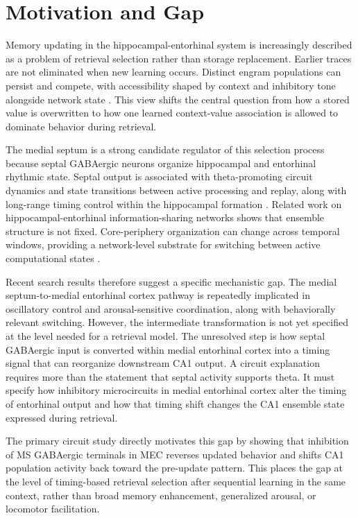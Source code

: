 \section{Motivation and Gap}

Memory updating in the hippocampal-entorhinal system is increasingly described as a problem of retrieval selection rather than storage replacement. Earlier traces are not eliminated when new learning occurs. Distinct engram populations can persist and compete, with accessibility shaped by context and inhibitory tone alongside network state \cite{arxiv250601659,arxiv220604924,arxiv171109876}. This view shifts the central question from how a stored value is overwritten to how one learned context-value association is allowed to dominate behavior during retrieval.

The medial septum is a strong candidate regulator of this selection process because septal GABAergic neurons organize hippocampal and entorhinal rhythmic state. Septal output is associated with theta-promoting circuit dynamics and state transitions between active processing and replay, along with long-range timing control within the hippocampal formation \cite{arxiv151001100}. Related work on hippocampal-entorhinal information-sharing networks shows that ensemble structure is not fixed. Core-periphery organization can change across temporal windows, providing a network-level substrate for switching between active computational states \cite{arxiv200106371}.

Recent search results therefore suggest a specific mechanistic gap. The medial septum-to-medial entorhinal cortex pathway is repeatedly implicated in oscillatory control and arousal-sensitive coordination, along with behaviorally relevant switching. However, the intermediate transformation is not yet specified at the level needed for a retrieval model. The unresolved step is how septal GABAergic input is converted within medial entorhinal cortex into a timing signal that can reorganize downstream CA1 output. A circuit explanation requires more than the statement that septal activity supports theta. It must specify how inhibitory microcircuits in medial entorhinal cortex alter the timing of entorhinal output and how that timing shift changes the CA1 ensemble state expressed during retrieval.

The primary circuit study directly motivates this gap by showing that inhibition of MS GABAergic terminals in MEC reverses updated behavior and shifts CA1 population activity back toward the pre-update pattern. This places the gap at the level of timing-based retrieval selection after sequential learning in the same context, rather than broad memory enhancement, generalized arousal, or locomotor facilitation.
